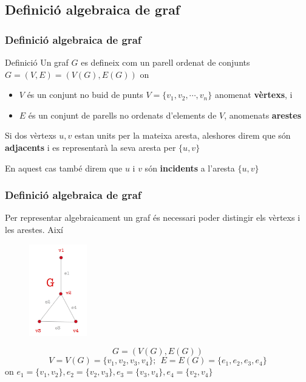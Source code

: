\documentclass{beamer}
\begin{document}
\subsection{Definició algebraica de graf}
\begin{frame}
\frametitle{Definició algebraica de graf}

\begin{block}{Definició}
Un graf $G$ es defineix com un parell ordenat de conjunts $G=(V,E) = (V(G), E(G))$ on
\begin{itemize}
\item $V$ és un conjunt no buid de punts $V=\{v_1,v_2,\cdots,v_n\}$ anomenat \textbf{vèrtexs}, i
\item $E$ és un conjunt de parells no ordenats d'elements de $V$, anomenats \textbf{arestes}
\end{itemize}
\end{block}
Si dos vèrtexs $u,v$ estan units per la mateixa aresta, aleshores direm que són \textbf{adjacents} i es representarà la seva aresta per $\{u,v\}$

En aquest cas també direm que $u$ i $v$ són \textbf{incidents} a l'aresta $\{u,v\}$

\end{frame}




\begin{frame}
\frametitle{Definició algebraica de graf}
Per representar algebraicament un graf és necessari poder distingir els vèrtexs i les arestes. Així

\begin{figure}[h]
 \label{fig:volum}
\centering
\includegraphics[height=4cm]{g3}
\end{figure}
\[G=(V(G),E(G))\]
\[V = V(G) = \{v_1,v_2,v_3,v_4\};\ \ E = E(G) = \{e_1,e_2,e_3,e_4\}\]
on $e_1 = \{v_1,v_2\}, e_2 = \{v_2,v_3\}, e_3 = \{v_3,v_4\}, e_4 = \{v_2,v_4\}$
\end{frame}
\end{document}
